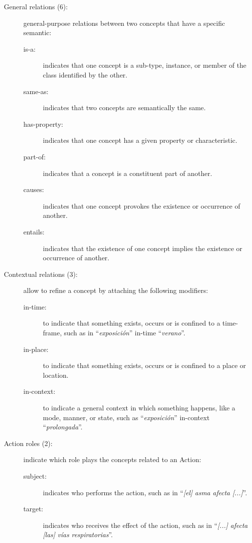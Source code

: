 \documentclass[11pt,a4paper]{article}
\begin{document}
\begin{description}
    \item[General relations (6):] general-purpose relations between two concepts that have a specific semantic:

    \begin{description}
        \item[is-a:] indicates that one concept is a sub-type, instance, or member of the class identified by the other.
        \item[same-as:] indicates that two concepts are semantically the same.
        \item[has-property:] indicates that one concept has a given property or characteristic.
        \item[part-of:] indicates that a concept is a constituent part of another.
        \item[causes:] indicates that one concept provokes the existence or occurrence of another.
        \item[entails:] indicates that the existence of one concept implies the existence or occurrence of another.

    \end{description}

    \item[Contextual relations (3):] allow to refine a concept by attaching the following modifiers:

    \begin{description}
        \item[in-time:] to indicate that something exists, occurs or is confined to a time-frame, such as in ``\textit{exposición}'' in-time ``\textit{verano}''.
        \item[in-place:] to indicate that something exists, occurs or is confined to a place or location.
        \item[in-context:] to indicate a general context in which something happens, like a mode, manner, or state, such as ``\textit{exposición}'' in-context ``\textit{prolongada}''.
    \end{description}

    \item[Action roles (2):] indicate which role plays the concepts related to an Action:

    \begin{description}
        \item[subject:] indicates who performs the action, such as in ``\textit{[el] asma afecta [...]}''.
        \item[target:] indicates who receives the effect of the action, such as in ``\textit{[...] afecta [las] vías respiratorias}''.
    \end{description}


\end{description}
\end{document}
